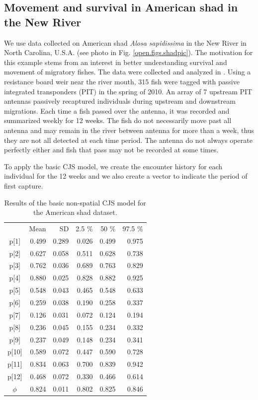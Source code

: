 \subsection{Movement and survival in American shad in the New River}

We use  data collected on
American shad \textit{Alosa sapidissima} in the New River in North
Carolina, U.S.A. (see photo in Fig. \ref{open.figs.shadpic}). 
The motivation for this example stems
from an interest in better understanding survival and movement of
migratory fishes.  
 The
data were collected and analyzed in \cite{raabe_diss:2012}.  Using a
resistance board weir near the river mouth, 315 fish were tagged with
passive integrated transponders (PIT) in the spring of 2010. An array
of 7 upstream PIT antennas passively recaptured individuals during
upstream and downstream migrations.  Each time a fish passed over the
antenna, it was recorded and summarized weekly for 12 weeks. The fish
do not necessarily move past all antenna and may remain in the river
between antenna for more than a week, thus they are not all detected
at each time period.  The antenna do not always operate perfectly
either and fish that pass may not be recorded at some times.

To apply the basic CJS model, we create the
encounter history for each individual for the 12 weeks and we also create
a vector to indicate the period of first capture.

\begin{table}
\centering
\caption{Results of the basic non-spatial CJS model for the American shad dataset.
}
\begin{tabular}{crrrrr}
\hline \hline
&    Mean   &  SD  &  2.5 \%   &   50 \%    &  97.5 \% \\
p[1] & 0.499 & 0.289 & 0.026 & 0.499 & 0.975 \\
p[2] & 0.627 & 0.058 & 0.511 & 0.628 & 0.738 \\
p[3] & 0.762 & 0.036 & 0.689 & 0.763 & 0.829 \\
p[4] & 0.880 & 0.025 & 0.828 & 0.882 & 0.925 \\
p[5] & 0.548 & 0.043 & 0.465 & 0.548 & 0.633 \\
p[6] & 0.259 & 0.038 & 0.190 & 0.258 & 0.337 \\
p[7] & 0.126 & 0.031 & 0.072 & 0.124 & 0.194 \\
p[8] & 0.236 & 0.045 & 0.155 & 0.234 & 0.332 \\
p[9] & 0.237 & 0.049 & 0.148 & 0.234 & 0.341 \\
p[10]& 0.589 & 0.072 & 0.447 & 0.590 & 0.728  \\
p[11]& 0.834 & 0.063 & 0.700 & 0.839 & 0.942 \\
p[12]& 0.468 & 0.072 & 0.330 & 0.466 & 0.614 \\
$\phi$  & 0.824 & 0.011 & 0.802 & 0.825 & 0.846 \\
\hline
\end{tabular}
\label{open.tab.simple-shad}
\end{table}


